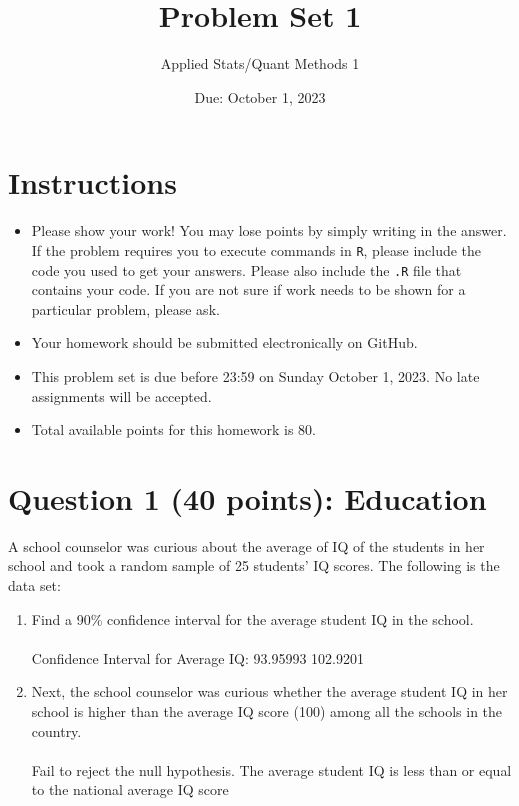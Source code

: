 \documentclass[12pt,letterpaper]{article}
\title{Problem Set 1}
\date{Due: October 1, 2023}
\author{Applied Stats/Quant Methods 1}
\begin{document}
	\maketitle
	
	\section*{Instructions}
	\begin{itemize}
	\item Please show your work! You may lose points by simply writing in the answer. If the problem requires you to execute commands in \texttt{R}, please include the code you used to get your answers. Please also include the \texttt{.R} file that contains your code. If you are not sure if work needs to be shown for a particular problem, please ask.
\item Your homework should be submitted electronically on GitHub.
\item This problem set is due before 23:59 on Sunday October 1, 2023. No late assignments will be accepted.
\item Total available points for this homework is 80.
	\end{itemize}
	
	\vspace{1cm}
	\section*{Question 1 (40 points): Education}

A school counselor was curious about the average of IQ of the students in her school and took a random sample of 25 students' IQ scores. The following is the data set:\\
\vspace{.5cm}

\vspace{1cm}

\begin{enumerate}
	\item Find a 90\% confidence interval for the average student IQ in the school.\\
  \\
 Confidence Interval for Average IQ: 93.95993 102.9201\\
\vspace{.25cm}
	
	\item Next, the school counselor was curious  whether  the average student IQ in her school is higher than the average IQ score (100) among all the schools in the country.\\ 
	  \\
	\noindent Fail to reject the null hypothesis. The average student IQ is less than or equal to the national average IQ score\\
	
\end{enumerate}
\end{document}

